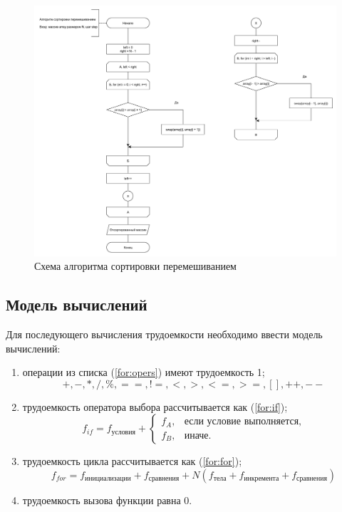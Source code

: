 \begin{figure}
	\centering
	\includegraphics[width=1.0\linewidth]{images/shake}
	\caption{Схема алгоритма сортировки перемешиванием}
	\label{fig:shake}
\end{figure}

\newpage


\subsection{Модель вычислений}
Для последующего вычисления трудоемкости необходимо ввести модель вычислений:
\begin{enumerate}
	\item операции из списка (\ref{for:opers}) имеют трудоемкость 1;
	\begin{equation}
		\label{for:opers}
		+, -, *, /, \%, ==, !=, <, >, <=, >=, [], ++, {-}-
	\end{equation}
	\item трудоемкость оператора выбора  рассчитывается как (\ref{for:if});
	\begin{equation}
		\label{for:if}
		f_{if} = f_{\text{условия}} +
		\begin{cases}
			f_A, & \text{если условие выполняется,}\\
			f_B, & \text{иначе.}
		\end{cases}
	\end{equation}
	\item трудоемкость цикла рассчитывается как (\ref{for:for});
	\begin{equation}
		\label{for:for}
		f_{for} = f_{\text{инициализации}} + f_{\text{сравнения}} + N(f_{\text{тела}} + f_{\text{инкремента}} + f_{\text{сравнения}})
	\end{equation}
	\item трудоемкость вызова функции равна 0.
\end{enumerate}


